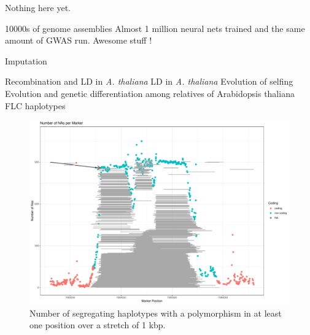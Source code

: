 Nothing here yet.

10000s of genome assemblies
Almost 1 million neural nets trained and the same amount of GWAS run.
Awesome stuff ! 


Imputation \cite{pook2019improving}

Recombination and LD in \textit{A. thaliana} \cite{kim2007recombination}
LD in \textit{A. thaliana} \cite{nordborg2002extent}
Evolution of selfing \cite{tang2007evolution}
Evolution and genetic differentiation among relatives of Arabidopsis thaliana \cite{koch2007evolution}
FLC haplotypes \cite{li2014multiple}


\begin{figure}[th]
\centering
\includegraphics[height=.55\textheight, width=1.1\textwidth]{Figures/plot_NAs_AT}
\decoRule
\caption[Haplotype structure on a 1kb window of chromosome 4 of
\textit{A. thaliana}]{Number of segregating haplotypes with a polymorphism in at least one
  position over a stretch of 1 kbp.}
\label{fig:chr_jul}
\end{figure}
\cite{dittberner2018natural}